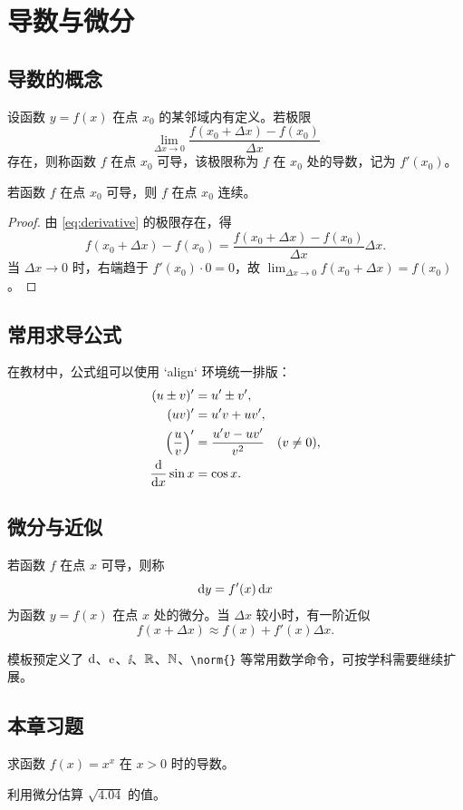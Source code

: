 \chapter{导数与微分}

\section{导数的概念}

\begin{definition}[导数]
设函数 $y=f(x)$ 在点 $x_0$ 的某邻域内有定义。若极限
\begin{equation}
  \lim_{\Delta x\to 0}\frac{f(x_0+\Delta x)-f(x_0)}{\Delta x}
  \label{eq:derivative}
\end{equation}
存在，则称函数 $f$ 在点 $x_0$ 可导，该极限称为 $f$ 在 $x_0$ 处的导数，记为 $f'(x_0)$。
\end{definition}

\begin{theorem}[可导必连续]
若函数 $f$ 在点 $x_0$ 可导，则 $f$ 在点 $x_0$ 连续。
\end{theorem}

\begin{proof}
由 \cref{eq:derivative} 的极限存在，得
\[
  f(x_0+\Delta x)-f(x_0)
  =
  \frac{f(x_0+\Delta x)-f(x_0)}{\Delta x}\Delta x.
\]
当 $\Delta x\to 0$ 时，右端趋于 $f'(x_0)\cdot 0=0$，故 $\lim_{\Delta x\to0}f(x_0+\Delta x)=f(x_0)$。
\end{proof}

\section{常用求导公式}

在教材中，公式组可以使用 `align` 环境统一排版：
\begin{align}
  (u\pm v)' &= u'\pm v',\\
  (uv)' &= u'v+uv',\\
  \left(\frac{u}{v}\right)' &= \frac{u'v-uv'}{v^2}\quad (v\ne0),\\
  \frac{\mathop{}\!\mathrm{d}}{\mathop{}\!\mathrm{d} x}\sin x &= \cos x.
\end{align}

\section{微分与近似}

若函数 $f$ 在点 $x$ 可导，则称
\[
  \mathop{}\!\mathrm{d} y=f'(x)\mathop{}\!\mathrm{d} x
\]
为函数 $y=f(x)$ 在点 $x$ 处的微分。当 $\Delta x$ 较小时，有一阶近似
\[
  f(x+\Delta x)\approx f(x)+f'(x)\Delta x.
\]

\begin{remark}
模板预定义了 $\mathop{}\!\mathrm{d}$、$\mathrm{e}$、$\ii$、$\mathbb{R}$、$\mathbb{N}$、\verb|\norm{}| 等常用数学命令，可按学科需要继续扩展。
\end{remark}

\section{本章习题}

\begin{exercise}
求函数 $f(x)=x^x$ 在 $x>0$ 时的导数。
\end{exercise}

\begin{exercise}
利用微分估算 $\sqrt{4.04}$ 的值。
\end{exercise}
